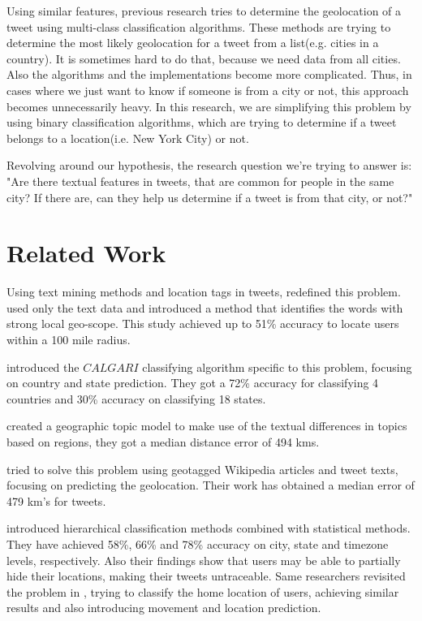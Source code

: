 \documentclass[twoside,11pt]{article}
\begin{document}
Using similar features, previous research tries to determine the geolocation of a tweet using multi-class classification algorithms. These methods are trying to determine the most likely geolocation for a tweet from a list(e.g. cities in a country). It is sometimes hard to do that, because we need data from all cities. Also the algorithms and the implementations become more complicated. Thus, in cases where we just want to know if someone is from a city or not, this approach becomes unnecessarily heavy. In this research, we are simplifying this problem by using binary classification algorithms, which are trying to determine if a tweet belongs to a location(i.e. New York City) or not. 

Revolving around our hypothesis, the research question we're trying to answer is: "Are there textual features in tweets, that are common for people in the same city? If there are, can they help us determine if a tweet is from that city, or not?"


\section{Related Work}

Using text mining methods and location tags in tweets, \cite{cheng2010you} redefined this problem. \cite{cheng2010you} used only the text data and introduced a method that identifies the words with strong local geo-scope. This study achieved up to 51\% accuracy to locate users within a 100 mile radius. 

\cite{hecht2011tweets} introduced the $CALGARI$ classifying algorithm specific to this problem, focusing on country and state prediction. They got a 72\% accuracy for classifying 4 countries and 30\% accuracy on classifying 18 states. 

\cite{eisenstein2010latent} created a geographic topic model to make use of the textual differences in topics based on regions, they got a median distance error of 494 kms. 

\cite{wing2011simple} tried to solve this problem using geotagged Wikipedia articles and tweet texts, focusing on predicting the geolocation. Their work has obtained a median error of 479 km's for tweets. 

\cite{mahmud2012tweet} introduced hierarchical classification methods combined with statistical methods. They have achieved 58\%, 66\% and 78\% accuracy on city, state and timezone levels, respectively. Also their findings show that users may be able to partially hide their locations, making their tweets untraceable. Same researchers revisited the problem in \cite{mahmud2014home}, trying to classify the home location of users, achieving similar results and also introducing movement and location prediction. 
\end{document}
